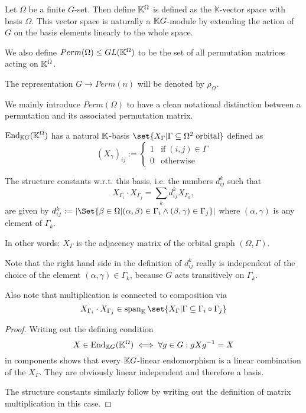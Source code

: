 \documentclass[fontsize=11pt,fleqn,a4paper]{scrartcl}
\begin{document}
\begin{definition}
Let $\Omega$ be a finite $G$-set. Then define $\mathbb{K}^\Omega$ is defined  as the $\mathbb{K}$-vector space with basis $\Omega$. This vector space is naturally a $\mathbb{K} G$-module by extending the action of $G$ on the basis elements linearly to the whole space.

We also define $Perm(\Omega) \leq GL(\mathbb{K}^\Omega)$ to be the set of all permutation matrices acting on $\mathbb{K}^\Omega$.

The representation $G\to Perm(n)$ will be denoted by $\rho_\Omega$.
\end{definition}

\begin{remark}
We mainly introduce $Perm(\Omega)$ to have a clean notational distinction between a permutation and its associated permutation matrix.
\end{remark}

\begin{theorem}
$\operatorname{End}_{\mathbb{K} G}(\mathbb{K}^\Omega)$ has a natural $\mathbb{K}$-basis $\set{X_\Gamma | \Gamma\subseteq\Omega^2\;\text{orbital}}$ defined as
\[(X_\gamma)_{ij} := \begin{cases} 1 & \text{if}\;(i,j)\in\Gamma \\ 0 & \text{otherwise}\end{cases}\]

The structure constants w.r.t. this basis, i.e. the numbers $d_{ij}^k$ such that
\[X_{\Gamma_i} \cdot X_{\Gamma_j} = \sum_{k} d_{ij}^k X_{\Gamma_k},\]
are given by $d_{ij}^k := \abs{\Set{\beta\in\Omega | (\alpha,\beta)\in\Gamma_i \wedge (\beta,\gamma) \in \Gamma_j}}$ where $(\alpha,\gamma)$ is any element of $\Gamma_k$.
\end{theorem}
\begin{remark}
In other words: $X_\Gamma$ is the adjacency matrix of the orbital graph $(\Omega,\Gamma)$.

Note that the right hand side in the definition of $d_{ij}^k$ really is independent of the choice of the element $(\alpha,\gamma)\in\Gamma_k$, because $G$ acts transitively on $\Gamma_k$.

Also note that multiplication is connected to composition via
\[X_{\Gamma_i} \cdot X_{\Gamma_j} \in \LinHull_\IK\set{X_\Gamma | \Gamma\subseteq \Gamma_i\circ\Gamma_j}\]
\end{remark}
\begin{proof}
Writing out the defining condition
\[X\in\operatorname{End}_{\mathbb{K} G}(\mathbb{K}^\Omega) \iff \forall g\in G: gXg^{-1} = X\]
in components shows that every $\mathbb{K} G$-linear endomorphism is a linear combination of the $X_\Gamma$. They are obviously linear independent and therefore a basis.

The structure constants similarly follow by writing out the definition of matrix multiplication in this case.
\end{proof}
\end{document}
